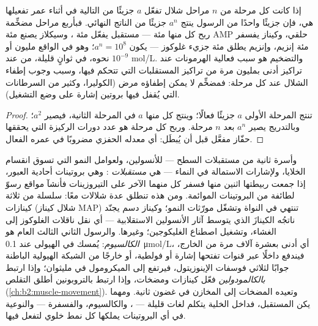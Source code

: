 \begin{theorem}\label{thm:b2:cell-signalling:amplification}
إذا كانت كل مرحلة من $n$ مراحل شلال تفعّل $a$ جزيئًا من
التالية في أثناء عمر تفعيلها هي، فإن جزيئًا واحدًا من
الرسول ينتج $a^{n}$ جزيئًا من الناتج النهائي. فبأربع
مراحل مضخِّمة ربح كل منها مئة --- مستقبل يفعّل
مئة ، وسيكلاز يصنع مئة AMP حلقي، وكيناز
يفسفر مئة إنزيم، وإنزيم يطلق مئة جزيء
غلوكوز --- يكون $a^{n} = 10^{8}$؛ وهو في الواقع مليون أو نحوه،
في ثوانٍ قليلة، من  عند $10^{-9}$ mol/L. والتضخيم
هو سبب فعالية الهرمونات عند تراكيز أدنى بمليون مرة
من تراكيز المستقلبات التي تتحكم فيها، وسبب وجوب
إطفاء الشلال عند كل مرحلة: فمضخِّم لا يمكن
إطفاؤه مرض (الكوليرا، وكثير من السرطانات التي يُقفل فيها
بروتين إشارة على وضع التشغيل).
\end{theorem}
\begin{proof}
تنتج المرحلة الأولى $a$ جزيئًا فعالًا؛ وينتج كل منها $a$
في المرحلة الثانية، فيصير $a^{2}$؛ وبالتدريج يصير $a^{n}$ بعد $n$ مرحلة.
وربح كل مرحلة هو عدد دورات الركيزة التي يحققها حفّاز
مفعَّل قبل أن يُبطَل: أي معدله الحفزي
مضروبًا في عمره الفعال.
\end{proof}

\begin{proposition}\label{prop:b2:cell-signalling:rtk}
وأسرة ثانية من مستقبلات السطح --- للأنسولين، ولعوامل النمو
التي تسوق انقسام الخلايا، ولإشارات الاستمالة في
النماء --- هي \emph{مستقبلات }: وهي
بروتينات أحادية العبور، إذا جمعت ربيطتها اثنين منها
فسفر كل منهما الآخر على التيروزينات فأنشآ مواقع رسوّ
لطائفة من البروتينات الموائمة. ومن هذه تنطلق عدة شلالات
معًا: سلسلة من ثلاثة كينازات (شلال كيناز MAP) تنتهي في
النواة وتشغّل مورّثات النمو؛ وكيناز دسم
يجنّد ناتجُه الكينازَ الذي يتوسط آثار الأنسولين
الاستقلابية --- أي نقل ناقلات الغلوكوز إلى الغشاء، وتشغيل
اصطناع الغليكوجين؛ وغيرها. والرسول الثاني الثالث
العام هو \emph{الكالسيوم}: يُمسك في الهيولى عند
\qty{0.1}{\micro mol/L}، أي أدنى بعشرة آلاف مرة من الخارج، فيندفع
داخلًا عبر قنوات تفتحها إشارة أو فولطية، أو خارجًا
من الشبكة الهيولية الباطنة جوابًا لثلاثي فوسفات الإينوزيتول،
فيرتفع إلى الميكرومول في مليثوان؛ وإذا ارتبط \emph{بالكالمودولين}
فعّل كينازات ومضخات، وإذا ارتبط بالتروبونين أطلق
التقلص (\cref{ch:b2:muscle-movement}). وتعيده المضخات إلى
المخازن في غضون ثانية. ومهما يكن المستقبل، فداخل الخلية
يتكلم لغات قليلة --- ، والكالسيوم، والفسفرة ---
والنوعية في أي البروتينات يملكها كل نمط خلوي لتفعل
فيها.
\end{proposition}

